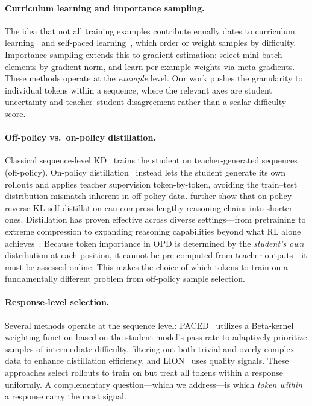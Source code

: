 \documentclass{article}
\begin{document}
\paragraph{Curriculum learning and importance sampling.}
The idea that not all training examples contribute equally dates to curriculum learning~\citep{bengio2009curriculum} and self-paced learning~\citep{kumar2010selfpaced}, which order or weight samples by difficulty.
Importance sampling extends this to gradient estimation: \citet{katharopoulos2018not} select mini-batch elements by gradient norm, and \citet{ren2018learning} learn per-example weights via meta-gradients.
These methods operate at the \emph{example} level.
Our work pushes the granularity to individual tokens within a sequence, where the relevant axes are student uncertainty and teacher--student disagreement rather than a scalar difficulty score.

\paragraph{Off-policy vs.\ on-policy distillation.}
Classical sequence-level KD~\citep{kim2016sequencekd} trains the student on teacher-generated sequences (off-policy).
On-policy distillation~\citep{agarwal2024gkd,gu2024minillm} instead lets the student generate its own rollouts and applies teacher supervision token-by-token, avoiding the train--test distribution mismatch inherent in off-policy data.
\citet{sang2026opsdc} further show that on-policy reverse KL self-distillation can compress lengthy reasoning chains into shorter ones.
Distillation has proven effective across diverse settings---from pretraining to extreme compression to expanding reasoning capabilities beyond what RL alone achieves~\citep{gu2024miniplm,xu2024onebit,yue2025doesrl}.
Because token importance in OPD is determined by the \emph{student's own} distribution at each position, it cannot be pre-computed from teacher outputs---it must be assessed online.
This makes the choice of which tokens to train on a fundamentally different problem from off-policy sample selection.

\paragraph{Response-level selection.}
Several methods operate at the sequence level: PACED~\citep{xu2026paced} utilizes a Beta-kernel weighting function based on the student model's pass rate to adaptively prioritize samples of intermediate difficulty, filtering out both trivial and overly complex data to enhance distillation efficiency, and LION~\citep{jiang2023lion} uses quality signals.
These approaches select rollouts to train on but treat all tokens within a response uniformly.
A complementary question---which we address---is which \emph{token within} a response carry the most signal.
\end{document}
